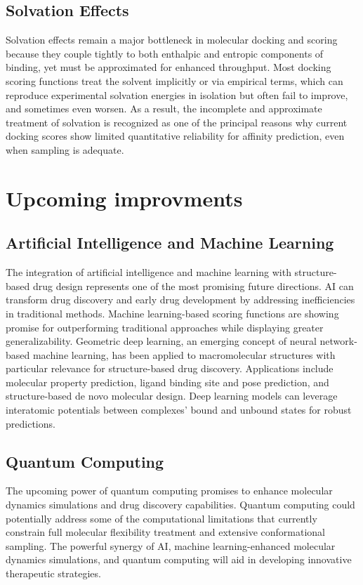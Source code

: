 \documentclass[12pt, a4paper]{article}
\begin{document}
\subsection{Solvation Effects}
Solvation effects remain a major bottleneck in molecular docking and scoring because they couple tightly to both enthalpic and entropic components of binding, yet must be approximated for enhanced throughput.  Most docking scoring functions treat the solvent implicitly or via empirical terms, which can reproduce experimental solvation energies in isolation but often fail to improve, and sometimes even worsen.  As a result, the incomplete and approximate treatment of solvation is recognized as one of the principal reasons why current docking scores show limited quantitative reliability for affinity prediction, even when sampling is adequate\cite{CH1_24}.

\section{Upcoming improvments}
\subsection{Artificial Intelligence and Machine Learning}
The integration of artificial intelligence and machine learning with structure-based drug design represents one of the most promising future directions. AI can transform drug discovery and early drug development by addressing inefficiencies in traditional methods. Machine learning-based scoring functions are showing promise for outperforming traditional approaches while displaying greater generalizability.
Geometric deep learning, an emerging concept of neural network-based machine learning, has been applied to macromolecular structures with particular relevance for structure-based drug discovery. Applications include molecular property prediction, ligand binding site and pose prediction, and structure-based de novo molecular design. Deep learning models can leverage interatomic potentials between complexes’ bound and unbound states for robust predictions.

\subsection{Quantum Computing}
The upcoming power of quantum computing promises to enhance molecular dynamics simulations and drug discovery capabilities. Quantum computing could potentially address some of the computational limitations that currently constrain full molecular flexibility treatment and extensive conformational sampling. The powerful synergy of AI, machine learning-enhanced molecular dynamics simulations, and quantum computing will aid in developing innovative therapeutic strategies.
\end{document}
